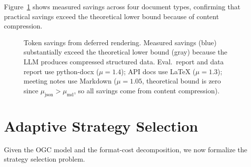 \documentclass[11pt,twocolumn]{article}
\begin{document}
Figure~\ref{fig:savings} shows measured savings across four
document types, confirming that practical savings exceed the
theoretical lower bound because of content compression.

\begin{figure}[t]
\centering
{}
\caption{Token savings from deferred rendering.  Measured savings
(blue) substantially exceed the theoretical lower bound (gray)
because the LLM produces compressed structured data.  Eval.\ report
and data report use python-docx ($\mu{=}1.4$); API docs use
\LaTeX{} ($\mu{=}1.3$); meeting notes use Markdown ($\mu{=}1.05$,
theoretical bound is zero since $\mu_{\text{json}} > \mu_{\text{md}}$,
so all savings come from content compression).}
\label{fig:savings}
\end{figure}


\section{Adaptive Strategy Selection}
\label{sec:strategy}

Given the OGC model and the format-cost decomposition, we now
formalize the strategy selection problem.
\end{document}
